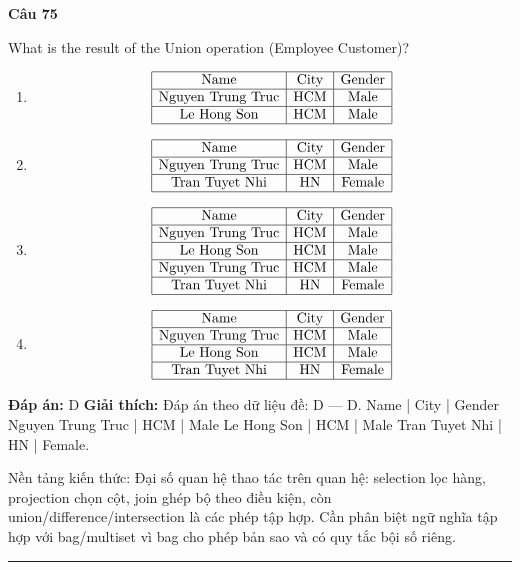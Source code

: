 \documentclass[11pt,a4paper]{article}
\newenvironment{question}[1]{%
  \par\vspace{1em}\noindent\textbf{\large Câu #1}\par\vspace{0.4em}
}{%
  \par\vspace{1em}\hrule\vspace{0.6em}
}
\newenvironment{choices}{%
  \begin{enumerate}[label=\textbf{\Alph*.},leftmargin=2.2em,itemsep=2pt,topsep=3pt]
}{%
  \end{enumerate}
}
\newcommand{\choice}{\item}
\begin{document}
\begin{question}{75}
What is the result of the Union operation (Employee \cup Customer)?
\begin{choices}
\choice $$\begin{array}{|c|c|c|}\hline \text{Name} & \text{City} & \text{Gender} \\\hline \text{Nguyen Trung Truc} & \text{HCM} & \text{Male} \\\hline \text{Le Hong Son} & \text{HCM} & \text{Male} \\\hline\end{array}$$
\choice $$\begin{array}{|c|c|c|}\hline \text{Name} & \text{City} & \text{Gender} \\\hline \text{Nguyen Trung Truc} & \text{HCM} & \text{Male} \\\hline \text{Tran Tuyet Nhi} & \text{HN} & \text{Female} \\\hline\end{array}$$
\choice $$\begin{array}{|c|c|c|}\hline \text{Name} & \text{City} & \text{Gender} \\\hline \text{Nguyen Trung Truc} & \text{HCM} & \text{Male} \\\hline \text{Le Hong Son} & \text{HCM} & \text{Male} \\\hline \text{Nguyen Trung Truc} & \text{HCM} & \text{Male} \\\hline \text{Tran Tuyet Nhi} & \text{HN} & \text{Female} \\\hline\end{array}$$
\choice $$\begin{array}{|c|c|c|}\hline \text{Name} & \text{City} & \text{Gender} \\\hline \text{Nguyen Trung Truc} & \text{HCM} & \text{Male} \\\hline \text{Le Hong Son} & \text{HCM} & \text{Male} \\\hline \text{Tran Tuyet Nhi} & \text{HN} & \text{Female} \\\hline\end{array}$$
\end{choices}
\textbf{Đáp án:} D
\textbf{Giải thích:} Đáp án theo dữ liệu đề: D — D. Name | City | Gender Nguyen Trung Truc | HCM | Male Le Hong Son | HCM | Male Tran Tuyet Nhi | HN | Female.

Nền tảng kiến thức: Đại số quan hệ thao tác trên quan hệ: selection lọc hàng, projection chọn cột, join ghép bộ theo điều kiện, còn union/difference/intersection là các phép tập hợp. Cần phân biệt ngữ nghĩa tập hợp với bag/multiset vì bag cho phép bản sao và có quy tắc bội số riêng.


\end{question}
\end{document}
